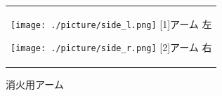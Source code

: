 \documentclass[10pt,a4j]{ujarticle}
\begin{document}
\begin{figure}[h]
 \centering
 \begin{tabular}{c}

  \begin{minipage}{0.3\hsize}
   \centering
   \texttt{[image: ./picture/side\_l.png]}
   \hspace{1.6cm} [1]アーム 左
  \end{minipage}
  
  \begin{minipage}{0.45\hsize}
   \centering
   \texttt{[image: ./picture/side\_r.png]}
   \hspace{1.6cm} [2]アーム 右
  \end{minipage}
 \end{tabular}
 \caption{消火用アーム}
 \label{arm_real}
\end{figure}





\end{document}
